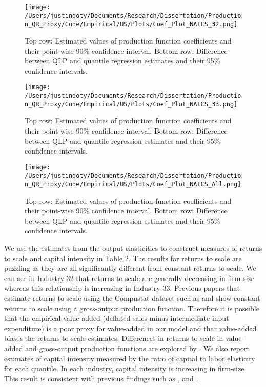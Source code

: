 \documentclass[11pt]{article}
\begin{document}
\begin{figure}[H]
\centering
\texttt{[image: /Users/justindoty/Documents/Research/Dissertation/Production\_QR\_Proxy/Code/Empirical/US/Plots/Coef\_Plot\_NAICS\_32.png]}
\caption{Top row: Estimated values of production function coefficients and their point-wise 90\% confidence interval. Bottom row: Difference between QLP and quantile regression estimates and their 95\% confidence intervals.}
\label{fig:32coef}
\end{figure}

\begin{figure}[H]
\centering
\texttt{[image: /Users/justindoty/Documents/Research/Dissertation/Production\_QR\_Proxy/Code/Empirical/US/Plots/Coef\_Plot\_NAICS\_33.png]}
\caption{Top row: Estimated values of production function coefficients and their point-wise 90\% confidence interval. Bottom row: Difference between QLP and quantile regression estimates and their 95\% confidence intervals.}
\label{fig:33coef}
\end{figure}

\begin{figure}[H]
\centering
\texttt{[image: /Users/justindoty/Documents/Research/Dissertation/Production\_QR\_Proxy/Code/Empirical/US/Plots/Coef\_Plot\_NAICS\_All.png]}
\caption{Top row: Estimated values of production function coefficients and their point-wise 90\% confidence interval. Bottom row: Difference between QLP and quantile regression estimates and their 95\% confidence intervals.}
\label{fig:USallcoef}
\end{figure}

We use the estimates from the output elasticities to construct measures of returns to scale and capital intensity in Table 2. The results for returns to scale are puzzling as they are all significantly different from constant returns to scale. We can see in Industry 32 that returns to scale are generally decreasing in firm-size whereas this relationship is increasing in Industry 33. Previous papers that estimate returns to scale using the Compustat dataset such as \cite{Keller2009} and \cite{mert} show constant returns to scale using a gross-output production function. Therefore it is possible that the empirical value-added (deflated sales minus intermediate input expenditure) is a poor proxy for value-added in our model and that value-added biases the returns to scale estimates. Differences in returns to scale in value-added and gross-output production functions are explored by \cite{Basu1997}. We also report estimates of capital intensity measured by the ratio of capital to labor elasticity for each quantile. In each industry, capital intensity is increasing in firm-size. This result is consistent with previous findings such as \cite{Holmes2008}, \cite{Kumar1999} and \cite{mert}.
\end{document}
